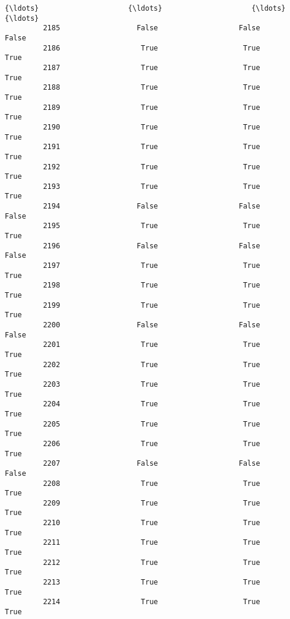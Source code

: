\documentclass[11pt]{llncs}
\begin{document}
\begin{Verbatim}[commandchars=\\\{\}]
         {\ldots}                     {\ldots}                     {\ldots}                 {\ldots}   
         2185                  False                   False               False   
         2186                   True                    True                True   
         2187                   True                    True                True   
         2188                   True                    True                True   
         2189                   True                    True                True   
         2190                   True                    True                True   
         2191                   True                    True                True   
         2192                   True                    True                True   
         2193                   True                    True                True   
         2194                  False                   False               False   
         2195                   True                    True                True   
         2196                  False                   False               False   
         2197                   True                    True                True   
         2198                   True                    True                True   
         2199                   True                    True                True   
         2200                  False                   False               False   
         2201                   True                    True                True   
         2202                   True                    True                True   
         2203                   True                    True                True   
         2204                   True                    True                True   
         2205                   True                    True                True   
         2206                   True                    True                True   
         2207                  False                   False               False   
         2208                   True                    True                True   
         2209                   True                    True                True   
         2210                   True                    True                True   
         2211                   True                    True                True   
         2212                   True                    True                True   
         2213                   True                    True                True   
         2214                   True                    True                True   
         

\end{Verbatim}
\end{document}
